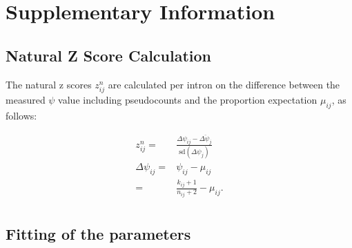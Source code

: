 \documentclass[a4paper,12pt]{article}
\begin{document}
\FloatBarrier


\section{Supplementary Information}

\subsection{Natural Z Score Calculation}

The natural z scores $z^{n}_{ij}$ are calculated per intron on the difference 
between the measured $\psi$ value including pseudocounts and the proportion 
expectation $\mu_{ij}$, as follows:

\begin{align*}
    z^n_{ij} =& \frac{\Delta\psi_{ij} - \overline{\Delta\psi_{j}}}{\text{sd}(\Delta\psi_{j})} \\
    \Delta\psi_{ij} =& \psi_{ij} - \mu_{ij} \\
                    =& \frac{k_{ij} + 1}{n_{ij} + 2} - \mu_{ij}. \\
\end{align*}


\subsection{Fitting of the parameters}






\end{document}
